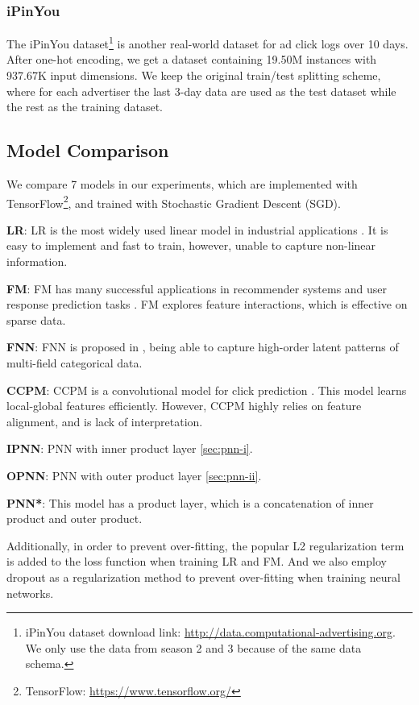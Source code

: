 \documentclass[conference]{IEEEtran}
\begin{document}
\subsubsection{iPinYou}
The iPinYou dataset\footnote{iPinYou dataset download link: \url{http://data.computational-advertising.org}. We only use the data from season 2 and 3 because of the same data schema.} is another real-world dataset for ad click logs over 10 days.
After one-hot encoding, we get a dataset containing 19.50M instances with 937.67K input dimensions.
We keep the original train/test splitting scheme, where for each advertiser the last 3-day data are used as the test dataset while the rest as the training dataset.



\subsection{Model Comparison}
We compare 7 models in our experiments, which are implemented with TensorFlow\footnote{TensorFlow: \url{https://www.tensorflow.org/}}, and trained with Stochastic Gradient Descent (SGD).


\textbf{LR}: LR is the most widely used linear model in industrial applications \cite{mcmahan2013ad}. It is easy to implement and fast to train, however, unable to capture non-linear information.

\textbf{FM}: FM has many successful applications in recommender systems and user response prediction tasks \cite{rendle2010factorization}. FM explores feature interactions, which is effective on sparse data.

\textbf{FNN}: FNN is proposed in \cite{zhang2016deep}, being able to capture high-order latent patterns of multi-field categorical data.

\textbf{CCPM}: CCPM is a convolutional model for click prediction \cite{liu2015convolutional}. This model learns local-global features efficiently. However, CCPM highly relies on feature alignment, and is lack of interpretation.

\textbf{IPNN}: PNN with inner product layer \ref{sec:pnn-i}.

\textbf{OPNN}: PNN with outer product layer \ref{sec:pnn-ii}.

\textbf{PNN*}: This model has a product layer, which is a concatenation of inner product and outer product.






Additionally, in order to prevent over-fitting, the popular L2 regularization term is added to the loss function  when training LR and FM.
And we also employ dropout as a regularization method to prevent over-fitting when training neural networks.
\end{document}
